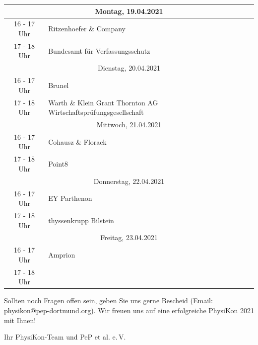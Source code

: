 \documentclass[
  paper=a4,
  fontsize=12pt,
  DIV=16,
  headheight=30pt,
  footheight=45pt,
  headinclude,
  parskip=half,
]{scrartcl}
\begin{document}
\begin{table}[h]
    \centering
\begin{tabular}{|c|l|}
    \hline
    \multicolumn{2}{|c|}{Montag, 19.04.2021} \\
    \hline
    \rowcolor{gray!10} 16 ­- 17 Uhr & Ritzenhoefer \& Company \\
    \rowcolor{gray!30} 17 - 18 Uhr & Bundesamt für Verfassungsschutz\\
    \hline
    \multicolumn{2}{|c|}{Dienstag, 20.04.2021} \\
    \hline
    \rowcolor{gray!10} 16 ­- 17 Uhr & Brunel \\
    \rowcolor{gray!30} 17 - 18 Uhr & Warth \& Klein Grant Thornton AG Wirtschaftsprüfungsgesellschaft\\
    \hline
    \multicolumn{2}{|c|}{Mittwoch, 21.04.2021} \\
    \hline
    \rowcolor{gray!10} 16 ­- 17 Uhr & Cohausz \& Florack \\
    \rowcolor{gray!30} 17 - 18 Uhr & Point8\\
    \hline
    \multicolumn{2}{|c|}{Donnerstag, 22.04.2021} \\
    \hline
    \rowcolor{gray!10}16 ­- 17 Uhr & EY Parthenon\\
    \rowcolor{gray!30}17 - 18 Uhr & thyssenkrupp Bilstein\\
    \hline
    \multicolumn{2}{|c|}{Freitag, 23.04.2021} \\
    \hline
    \rowcolor{gray!10}16 ­- 17 Uhr & Amprion \\
    \rowcolor{gray!30}17 - 18 Uhr & \\
    \hline
    \end{tabular}

\end{table}



Sollten noch Fragen offen sein, geben Sie uns gerne Bescheid (Email: physikon@pep-dortmund.org).
Wir freuen uns auf eine erfolgreiche PhysiKon 2021 mit Ihnen!

\vspace{1cm}
Ihr PhysiKon-Team und PeP et al. e.\,V.
\end{document}
